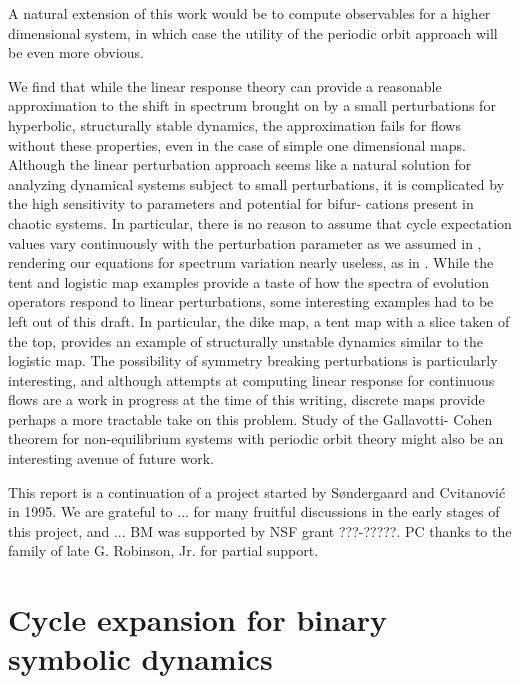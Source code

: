 \documentclass[aps,pre,
                showpacs,
                twocolumn,
                groupedaddress,
                superscriptaddress,
                floatfix]{revtex4-1}
\begin{document}
A natural extension of this work would be to compute observables for a
higher dimensional system, in which case the utility of the periodic
orbit approach will be even more obvious.

We find that while the linear response theory can provide a reasonable
approximation to the shift in spectrum brought on by a small
perturbations for hyperbolic, structurally stable dynamics, the
approximation fails for flows without these properties, even in the case
of simple one dimensional maps. Although the linear perturbation approach
seems like a natural solution for analyzing dynamical systems subject to
small perturbations, it is complicated by the high sensitivity to
parameters and potential for bifur- cations present in chaotic systems.
In particular, there is no reason to assume that cycle expectation values
vary continuously with the perturbation parameter as we assumed in
, rendering our equations for spectrum variation
nearly useless, as in .
While the tent and logistic map examples provide a taste of how the
spectra of evolution operators respond to linear perturbations, some
interesting examples had to be left out of this draft. In particular, the
dike map, a tent map with a slice taken of the top, provides
an example of structurally unstable dynamics similar to the logistic map.
The possibility of symmetry breaking perturbations is particularly
interesting, and although attempts at computing linear response for
continuous flows are a work in progress at the time of this writing,
discrete maps provide perhaps a more tractable take on this problem.
Study of the Gallavotti- Cohen theorem for non-equilibrium systems
with periodic orbit theory might also be an interesting avenue of future
work.


\begin{acknowledgments}
This report is a continuation of a project started by S{\o}ndergaard and
Cvitanovi\'c in 1995.
We are grateful to ... for many fruitful discussions in
the early stages of this project, and ...
BM was supported by NSF grant ???-?????.
PC thanks to the family of late G. Robinson, Jr. for partial support.
\end{acknowledgments}

\appendix

\section{Cycle expansion for binary symbolic dynamics}
\label{appe:cyclBinarySymbolic}
\end{document}
